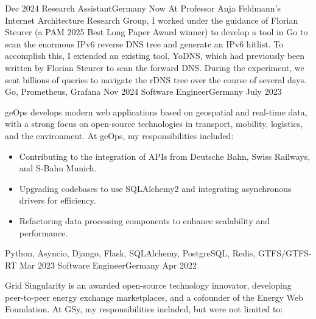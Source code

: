 %
%
%

\begin{experiences}
  \experience
    {Dec 2024} {Research Assistant}{}{Germany}
    {Now} {
        At Professor Anja Feldmann's Internet Architecture Research Group,
        I worked under the guidance of Florian Steurer (a PAM 2025 Best Long Paper Award winner)
        to develop a tool in Go to scan the enormous IPv6 reverse DNS tree and generate an IPv6 hitlist.
        To accomplish this, I extended an existing tool, YoDNS, which had previously been written
        by Florian Steurer to scan the forward DNS. During the experiment, we sent billions of queries
        to navigate the rDNS tree over the course of several days.
    }
    {Go, Prometheus, Grafana}
  \emptySeparator
  \experience
    {Nov 2024} {Software Engineer}{}{Germany}
    {July 2023} {
      geOps develops modern web applications based on geospatial and real-time data,
      with a strong focus on open-source technologies in transport, mobility, logistics,
      and the environment. At geOps, my responsibilities included:
      \begin{itemize}
        \item Contributing to the integration of APIs from Deutsche Bahn, Swiss Railways, and S-Bahn Munich.
        \item Upgrading codebases to use SQLAlchemy2 and integrating asynchronous drivers for efficiency.
        \item Refactoring data processing components to enhance scalability and performance.
      \end{itemize}
    }
    {Python, Asyncio, Django, Flask, SQLAlchemy, PostgreSQL, Redis, GTFS/GTFS-RT}
  \emptySeparator
  \experience
  {Mar 2023} {Software Engineer}{}{Germany}
  {Apr 2022} {
    Grid Singularity is an awarded open-source technology innovator,
    developing peer-to-peer energy exchange marketplaces, and a cofounder
    of the Energy Web Foundation. At GSy, my responsibilities included,
    but were not limited to:
    \begin{itemize}

\end{itemize}}
\end{experiences}
